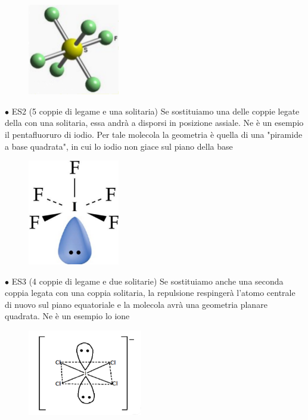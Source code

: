 \begin{figure}[htp]
    \centering
    \includegraphics[width=4cm]{immagini/SF_6.png}
\end{figure}
$\bullet$ ES2  (5 coppie di legame e una solitaria)
Se sostituiamo una delle coppie legate della con una solitaria, essa andrà a disporsi in posizione assiale. Ne è un esempio il pentafluoruro di iodio. Per tale molecola la geometria è quella di una "piramide a base quadrata", in cui lo iodio non giace sul piano della base

\begin{figure}[htp]
    \centering
    \includegraphics[width=4cm]{immagini/IF_5.png}
\end{figure}

$\bullet$ ES3  (4 coppie di legame e due solitarie)
Se sostituiamo anche una seconda coppia legata con una coppia solitaria, la repulsione respingerà l'atomo centrale di nuovo sul piano equatoriale e la molecola avrà una geometria planare quadrata. Ne è un esempio lo ione 

\begin{figure}[htp]
    \centering
    \includegraphics[width=5cm]{immagini/ICl_4.png}
\end{figure}

